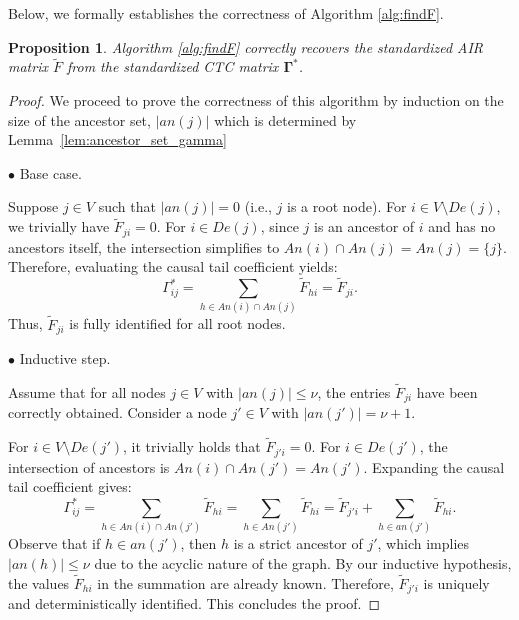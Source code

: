 \documentclass[10pt]{article}
\newtheorem{proposition}[theorem]{Proposition}
\begin{document}
 Below, we formally establishes the correctness of Algorithm \ref{alg:findF}. 
\begin{proposition}\label{Pro:alg}
Algorithm \ref{alg:findF} correctly recovers the standardized   AIR matrix $\widetilde{F}$    from the standardized CTC  matrix $\boldsymbol{\Gamma}^*$.
\end{proposition}
\begin{proof} 
    We proceed to prove the correctness of this algorithm by induction on the size of the ancestor set, $|{an}(j)|$ which is determined by  Lemma~\ref{lem:ancestor_set_gamma}
    
    $\bullet$  Base case. 
    
    Suppose $j \in V$ such that $|{an}(j)| = 0$ (i.e., $j$ is a root node). For $i \in V \setminus {De}(j)$, we trivially have $\widetilde{F}_{ji} = 0$. For $i \in {De}(j)$, since $j$ is an ancestor of $i$ and has no ancestors itself, the intersection simplifies to ${An}(i) \cap {An}(j) = {An}(j) = \{j\}$. Therefore, evaluating the causal tail coefficient yields:
    \[
        \Gamma^*_{ij} = \sum_{h \in {An}(i) \cap {An}(j)} \widetilde{F}_{hi} = \widetilde{F}_{ji}.
    \]
    Thus, $\widetilde{F}_{ji}$ is fully identified for all root nodes.
    
     $\bullet$   Inductive step.
     
     Assume that for all nodes $j \in V$ with $|{an}(j)| \le \nu$, the entries $\widetilde{F}_{ji}$ have been correctly obtained. Consider a node $j' \in V$ with $|{an}(j')| = \nu + 1$. 
    
    For $i \in V \setminus {De}(j')$, it trivially holds that $\widetilde{F}_{j'i} = 0$. For $i \in {De}(j')$, the intersection of ancestors is ${An}(i) \cap {An}(j') = {An}(j')$. Expanding the causal tail coefficient gives:
    \[
        \Gamma^*_{ij} = \sum_{h \in {An}(i) \cap {An}(j')} \widetilde{F}_{hi} = \sum_{h \in {An}(j')} \widetilde{F}_{hi} = \widetilde{F}_{j'i} + \sum_{h \in {an}(j')} \widetilde{F}_{hi}.
    \]
    Observe that if $h \in {an}(j')$, then $h$ is a strict ancestor of $j'$, which  implies $|{an}(h)| \le \nu$ due to the acyclic nature of the graph. By our inductive hypothesis, the values $\widetilde{F}_{hi}$ in the summation are already known. Therefore, $\widetilde{F}_{j'i}$ is uniquely and deterministically identified. This concludes the proof.



    
\end{proof}
\end{document}
